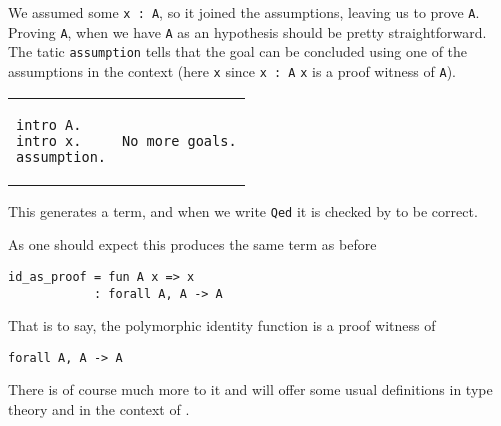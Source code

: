 We assumed some \texttt{x : A}, so it joined the assumptions, leaving
us to prove \texttt{A}.
Proving \texttt{A}, when we have \texttt{A} as an hypothesis
should be pretty straightforward. The tatic \texttt{assumption}
tells \Coq that the goal can be concluded using one of the assumptions in the
context (here \texttt{x} since \texttt{x : A} \ie
\texttt{x} is a proof witness of \texttt{A}).

\begingroup
\centering
\begin{tabular}{p{}|p{}}
\begin{verbatim}
intro A.
intro x.
assumption.
\end{verbatim}
&
\begin{verbatim}
No more goals.
\end{verbatim}
\end{tabular}
\endgroup

This generates a term, and when we write \texttt{Qed} it is checked
by \Coq to be correct.

As one should expect this produces the same term as before
\begin{verbatim}
id_as_proof = fun A x => x
            : forall A, A -> A
\end{verbatim}
That is to say, the polymorphic identity function is a proof witness of
\begin{verbatim}
forall A, A -> A
\end{verbatim}

There is of course much more to it and  will offer some
usual definitions in type theory and in the context of \Coq.